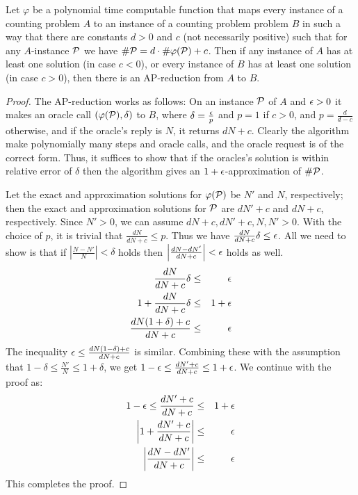 \begin{lemma}\label{lem:linear}
Let \(\varphi\) be a polynomial time computable function that maps every instance of a
counting problem \(A\) to an instance of a counting problem problem \(B\) in such a way that
there are constants \(d > 0\) and \(c\) (not necessarily positive) such that
for any \(A\)-instance \(\mathcal{P}\) we have
\(\#\mathcal{P} = d\cdot \#\varphi(\mathcal{P}) + c\)\@. Then if any instance of \(A\)
has at least one solution 
(in case \(c < 0\)), or every instance of \(B\) has at least one solution (in case \(c>0\)), then
there is an AP-reduction from \(A\) to \(B\)\@.
\end{lemma}

\begin{proof}
The AP-reduction works as follows: On an instance \(\mathcal{P}\) of \(A\) and \(\epsilon > 0\) it makes 
an oracle call \((\varphi(\mathcal{P}),\delta)\) to \(B\), where \(\delta = \frac{\epsilon}{p}\) and 
\(p = 1\) if \(c > 0\), and \(p = \frac{d}{d-c}\) otherwise,
and if the oracle's reply is \(N\), it returns \(dN + c\)\@. Clearly the algorithm make polynomially 
many steps and oracle calls, and the oracle request is of the correct form.
Thus, it suffices to show that if the oracles's solution is within relative error of \(\delta\) then
the algorithm gives an \(1+\epsilon\)-approximation of \(\#\mathcal{P}\)\@.

Let the exact and approximation solutions for \(\varphi(\mathcal{P})\) be \(N'\) and \(N\), respectively;
then the exact and approximation solutions for \(\mathcal{P}\) are  
\(dN' +c\) and \(dN + c\), respectively. Since \(N' > 0\), we can 
assume \(dN+c,dN'+c,N,N'>0\)\@. With the choice of \(p\), it is trivial that
 \(\frac{dN}{dN+c} \le p\)\@. Thus we have \(\frac{dN}{dN+c}\delta \le \epsilon\).
All we need to show is that if \(\left|\frac{N-N'}{N}\right|<\delta\) holds then
\(\left|\frac{dN-dN'}{dN+c}\right|<\epsilon\) holds as well.
\begin{eqnarray*}
\frac{dN}{dN+c}\delta & \le & \epsilon \\
1 + \frac{dN}{dN+c}\delta & \le & 1 + \epsilon \\
\frac{d N (1+\delta)+c}{d N + c} & \le & \epsilon \\
\end{eqnarray*}
The inequality \(\epsilon \le \frac{d N (1-\delta)+c}{d N + c}\) is similar.
Combining these with the assumption that \(1-\delta \le \frac{N'}{N} \le 1 + \delta \),
we get \(1-\epsilon \le \frac{dN'+c}{dN+c} \le 1 + \epsilon\). We continue with the proof as:
\begin{eqnarray*}
1-\epsilon \le \frac{dN'+c}{dN+c} & \le & 1 + \epsilon \\
\left|1 + \frac{dN' + c}{dN + c}\right| &\le & \epsilon \\
\left| \frac{dN-dN'}{dN+c}\right| & \le& \epsilon
\end{eqnarray*}
This completes the proof.
\end{proof}

